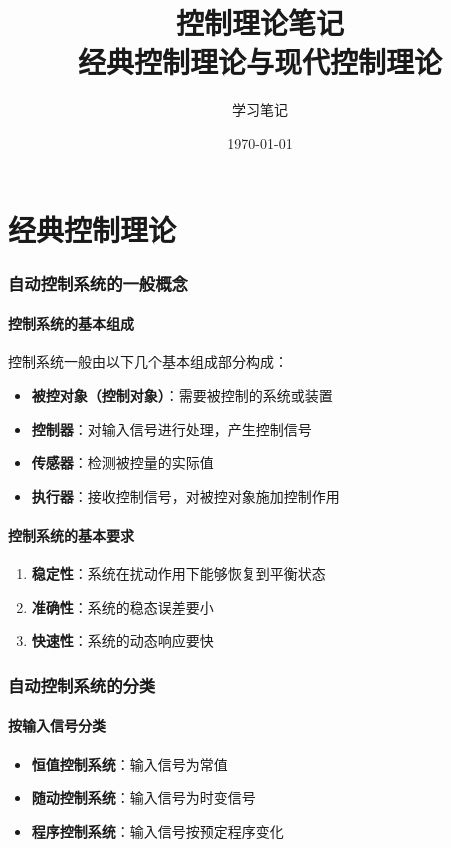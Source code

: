 \documentclass[12pt,a4paper]{article}
\title{\textbf{控制理论笔记}\\[0.5em]\large 经典控制理论与现代控制理论}
\author{学习笔记}
\date{\today}
\begin{document}
\maketitle
\tableofcontents
\newpage

\part{经典控制理论}

\section{自动控制系统的一般概念}

\subsection{控制系统的基本组成}
控制系统一般由以下几个基本组成部分构成：
\begin{itemize}
    \item \textbf{被控对象（控制对象）}：需要被控制的系统或装置
    \item \textbf{控制器}：对输入信号进行处理，产生控制信号
    \item \textbf{传感器}：检测被控量的实际值
    \item \textbf{执行器}：接收控制信号，对被控对象施加控制作用
\end{itemize}

\subsection{控制系统的基本要求}
\begin{enumerate}
    \item \textbf{稳定性}：系统在扰动作用下能够恢复到平衡状态
    \item \textbf{准确性}：系统的稳态误差要小
    \item \textbf{快速性}：系统的动态响应要快
\end{enumerate}

\section{自动控制系统的分类}

\subsection{按输入信号分类}
\begin{itemize}
    \item \textbf{恒值控制系统}：输入信号为常值
    \item \textbf{随动控制系统}：输入信号为时变信号
    \item \textbf{程序控制系统}：输入信号按预定程序变化
\end{itemize}
\end{document}
